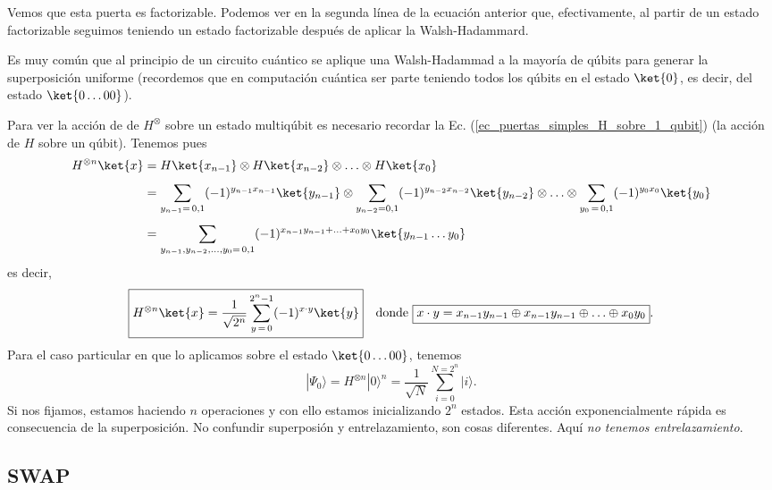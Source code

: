 \documentclass[a4paper,11pt]{book} %
\numberwithin{equation}{chapter}
\begin{document}
Vemos que esta puerta es factorizable. Podemos ver en la segunda línea de la ecuación anterior que, efectivamente, al partir de un estado factorizable seguimos teniendo un estado factorizable después de aplicar la Walsh-Hadammard. 

Es muy común que al principio de un circuito cuántico se aplique una Walsh-Hadammad a la mayoría de qúbits para generar la superposición uniforme (recordemos que en computación cuántica ser parte teniendo todos los qúbits en el estado $\ket{0}$, es decir, del estado $\ket{0\dots00}$).

Para ver la acción de de $H^\otimes$ sobre un estado multiqúbit es necesario recordar la Ec. (\ref{ec_puertas_simples_H_sobre_1_qubit}) (la acción de $H$ sobre un qúbit). Tenemos pues
	\begin{align*}
	H^{\otimes n} \ket{x} & = H\ket{x_{n-1}}\otimes H\ket{x_{n-2}}\otimes \ldots \otimes H\ket{x_0} \\  \rule{0mm}{5mm} 
	& = \sum_{y_{n-1}= \, 0,1} (-1)^{y_{n-1}x_{n-1}}\ket{y_{n-1}}\otimes \sum_{y_{n-2}=0,1} (-1)^{y_{n-2}x_{n-2}}\ket{y_{n-2}} \otimes \ldots \otimes  \sum_{y_{0}\, =\, 0,1} (-1)^{y_{0}x_{0}}\ket{y_{0}} \\  \rule{0mm}{5mm} 
	& = \sum_{y_{n-1}, y_{n-2},\ldots, y_{0}=\, 0,1} (-1)^{x_{n-1} y_{n-1}+ \ldots + x_0 y_0} \ket{y_{n-1}\ldots y_0}
	\end{align*}
es decir, 
	\begin{equation} \label{ec_multiqubit_Walsh_H_sobre_x}
	\boxed{H^{\otimes n} \ket{x} = \frac{1}{\sqrt{2^n}} \sum_{y \, =\, 0}^{2^n-1}(-1)^{x\cdot y} \ket{y}} ~~ \text{ donde } \boxed{x\cdot y = x_{n-1} y_{n-1} \oplus x_{n-1} y_{n-1} \oplus \ldots \oplus x_0 y_0}.
	\end{equation} 
Para el caso particular en que lo aplicamos sobre el estado $\ket{0\ldots00}$, tenemos
	\begin{equation} \label{ec_multiqubit_Walsh_H_sobre_0}
	\boxed{|\Psi_0 \rangle = H^{\otimes n} |0 \rangle^{n} = \frac{1}{\sqrt{N}}  \sum_{i=0}^{N=2^n} | i \rangle}.
	\end{equation}
Si nos fijamos, estamos haciendo $n$ operaciones y con ello estamos inicializando $2^n$ estados. Esta acción exponencialmente rápida es consecuencia de la superposición. No confundir superposión y entrelazamiento, son cosas diferentes. Aquí \textit{no tenemos entrelazamiento}.
        
        \subsection{SWAP}
\end{document}

